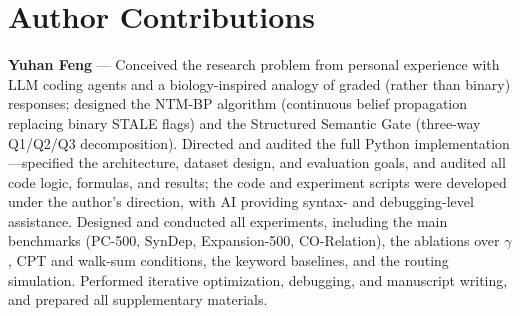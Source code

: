 \documentclass{article}
\theoremstyle{definition}
\begin{document}
\section*{Author Contributions}

\textbf{Yuhan Feng} --- Conceived the research problem from personal
experience with LLM coding agents and a biology-inspired analogy of
graded (rather than binary) responses; designed the NTM-BP algorithm
(continuous belief propagation replacing binary STALE flags) and the
Structured Semantic Gate (three-way Q1/Q2/Q3 decomposition). Directed and
audited the full Python implementation---specified the architecture,
dataset design, and evaluation goals, and audited all code logic,
formulas, and results; the code and experiment scripts were developed
under the author's direction, with AI providing syntax- and
debugging-level assistance. Designed
and conducted all experiments,
including the main benchmarks (PC-500, SynDep, Expansion-500,
CO-Relation), the ablations over $\gamma$, CPT and walk-sum conditions,
the keyword baselines, and the routing simulation. Performed iterative
optimization, debugging, and manuscript writing, and prepared all
supplementary materials.

\end{document}

